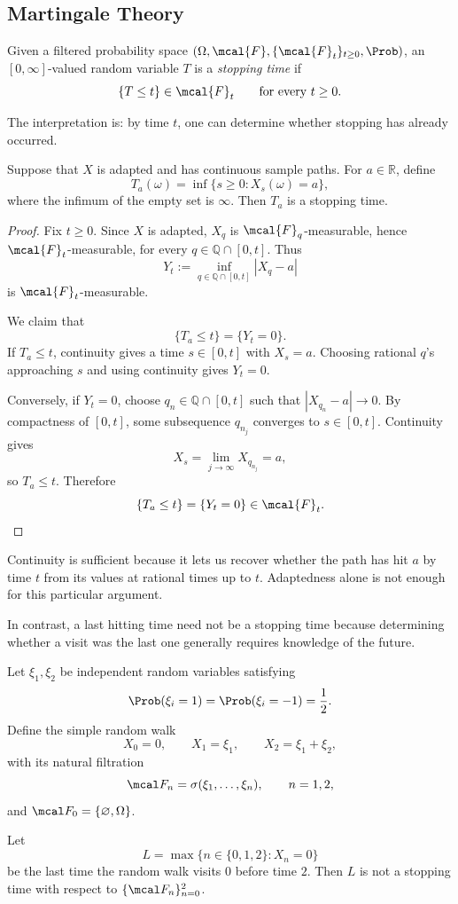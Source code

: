\subsection*{Martingale Theory}

\begin{definition}
Given a filtered probability space
$(\Omega,\mcal{F},\{\mcal{F}_t\}_{t\geq 0},\Prob)$, an
$[0,\infty]$-valued random variable $T$ is a \emph{stopping time} if
\[
    \{T\leq t\}\in\mcal{F}_t
    \qquad \text{for every }t\geq 0.
\]
\end{definition}

The interpretation is: by time $t$, one can determine whether stopping
has already occurred.

\begin{proposition}
Suppose that $X$ is adapted and has continuous sample paths. For
$a\in\mathbb{R}$, define
\[
    T_a(\omega)
    = \inf\{s\geq 0:X_s(\omega)=a\},
\]
where the infimum of the empty set is $\infty$. Then $T_a$ is a
stopping time.
\end{proposition}

\begin{proof}
Fix $t\geq 0$. Since $X$ is adapted, $X_q$ is
$\mcal{F}_q$-measurable, hence $\mcal{F}_t$-measurable, for every
$q\in\mathbb{Q}\cap[0,t]$. Thus
\[
    Y_t
    := \inf_{q\in\mathbb{Q}\cap[0,t]} |X_q-a|
\]
is $\mcal{F}_t$-measurable.

We claim that
\[
    \{T_a\leq t\}=\{Y_t=0\}.
\]
If $T_a\leq t$, continuity gives a time $s\in[0,t]$ with $X_s=a$.
Choosing rational $q$'s approaching $s$ and using continuity gives
$Y_t=0$.

Conversely, if $Y_t=0$, choose $q_n\in\mathbb{Q}\cap[0,t]$ such that
$|X_{q_n}-a|\to 0$. By compactness of $[0,t]$, some subsequence
$q_{n_j}$ converges to $s\in[0,t]$. Continuity gives
\[
    X_s=\lim_{j\to\infty}X_{q_{n_j}}=a,
\]
so $T_a\leq t$. Therefore
\[
    \{T_a\leq t\}=\{Y_t=0\}\in\mcal{F}_t.
\]
\end{proof}

Continuity is sufficient because it lets us recover whether the path
has hit $a$ by time $t$ from its values at rational times up to $t$.
Adaptedness alone is not enough for this particular argument.

In contrast, a last hitting time need not be a stopping time because determining whether a visit was the last one generally requires knowledge of the future.
\begin{example}
Let $\xi_1,\xi_2$ be independent random variables satisfying
\[
    \Prob(\xi_i=1)=\Prob(\xi_i=-1)=\frac12.
\]
Define the simple random walk
\[
    X_0=0,\qquad X_1=\xi_1,\qquad X_2=\xi_1+\xi_2,
\]
with its natural filtration
\[
    \mcal F_n=\sigma(\xi_1,\ldots,\xi_n),
    \qquad n=1,2,
\]
and $\mcal F_0=\{\varnothing,\Omega\}$.

Let
\[
    L=\max\{n\in\{0,1,2\}:X_n=0\}
\]
be the last time the random walk visits $0$ before time $2$.
Then $L$ is not a stopping time with respect to
$\{\mcal F_n\}_{n=0}^2$.
\end{example}

